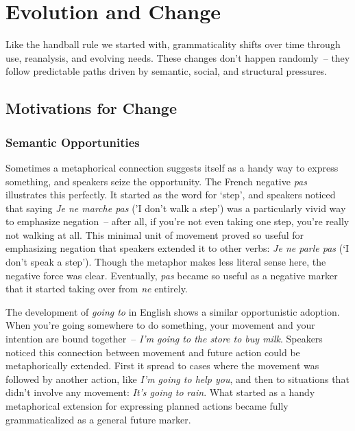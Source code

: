 \section{Evolution and Change}

Like the handball rule we started with, grammaticality shifts over time through use, reanalysis, and evolving needs. These changes don't happen randomly~-- they follow predictable paths driven by semantic, social, and structural pressures.

\subsection{Motivations for Change}

\subsubsection{Semantic Opportunities}
Sometimes a metaphorical connection suggests itself as a handy way to express something, and speakers seize the opportunity. The French negative \textit{pas} illustrates this perfectly. It started as the word for `step', and speakers noticed that saying \textit{Je ne marche pas} ('I don't walk a step') was a particularly vivid way to emphasize negation~-- after all, if you're not even taking one step, you're really not walking at all. This minimal unit of movement proved so useful for emphasizing negation that speakers extended it to other verbs: \textit{Je ne parle pas} (`I don't speak a step'). Though the metaphor makes less literal sense here, the negative force was clear. Eventually, \textit{pas} became so useful as a negative marker that it started taking over from \textit{ne} entirely.

The development of \textit{going to} in English shows a similar opportunistic adoption. When you're going somewhere to do something, your movement and your intention are bound together~-- \textit{I'm going to the store to buy milk}. Speakers noticed this connection between movement and future action could be metaphorically extended. First it spread to cases where the movement was followed by another action, like \textit{I'm going to help you}, and then to situations that didn't involve any movement: \textit{It's going to rain}. What started as a handy metaphorical extension for expressing planned actions became fully grammaticalized as a general future marker.

